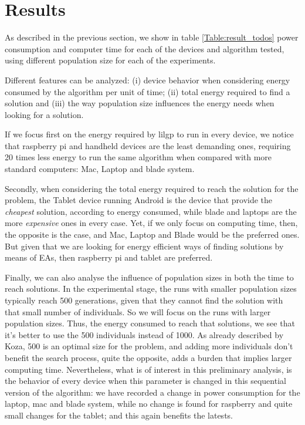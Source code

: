 \section{Results}
\label{results}

As described in the previous section, we show in table \ref{Table:result_todos} power consumption and computer time for each of the devices and algorithm tested, using different population size for each of the experiments.  

Different features can be analyzed:  (i) device behavior when considering energy consumed by the algorithm per unit of time; (ii) total energy required to find a solution and (iii) the way population size influences the energy needs when looking for a solution.

If we focus first on the energy required by lilgp to run in every device, we notice that raspberry pi and handheld devices are the least demanding ones, requiring 20 times less energy to run the same algorithm when compared with more standard computers:  Mac, Laptop and blade system.

Secondly, when considering the total energy required to reach the solution for the problem, the Tablet device running Android is the device that provide the \textit{cheapest} solution, according to energy consumed, while blade and laptops are the more \textit{expensive} ones in every case.  Yet, if we only focus on computing time, then, the opposite is the case, and Mac, Laptop and Blade would be the preferred ones.  But given that we are looking for energy efficient ways of finding solutions by means of EAs, then raspberry pi and tablet are preferred.

Finally, we can also analyse the influence of population sizes in both the time to reach solutions.  In the experimental stage, the runs with smaller population sizes typically reach 500 generations, given that they cannot find the solution with that small number of individuals.  So we will focus on the runs with larger population sizes.  Thus, the energy consumed to reach that solutions, we see that it's better to use the 500 individuals instead of 1000.  As already described by Koza, 500 is an optimal size for the problem, and adding more individuals don't benefit the search process, quite the opposite, adds a burden that implies larger computing time.  Nevertheless, what is of interest in this preliminary analysis, is the behavior of every device when this parameter is changed in this sequential version of the algorithm:  we have recorded a change in power consumption for the laptop, mac and blade system, while no change is found for raspberry and quite small changes for the tablet;  and this again benefits the latests.  

